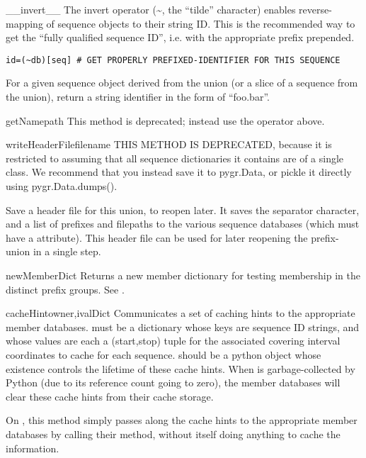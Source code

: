 \documentclass{howto}
\begin{document}
\begin{funcdesc}{__invert__}{}
  The invert operator (\textasciitilde, the ``tilde'' character) 
  enables reverse-mapping of sequence objects to their string ID.
  This is the recommended way to get the ``fully qualified sequence ID'', i.e. with
  the appropriate prefix prepended. 
\begin{verbatim}
id=(~db)[seq] # GET PROPERLY PREFIXED-IDENTIFIER FOR THIS SEQUENCE
\end{verbatim}
  For a given sequence object  derived from the union
  (or a slice of a sequence from the union), return a string identifier
  in the form of ``foo.bar''.  
\end{funcdesc}

\begin{funcdesc}{getName}{path}
  This method is deprecated; instead use the  operator
  above.
\end{funcdesc}

\begin{funcdesc}{writeHeaderFile}{filename}
  THIS METHOD IS DEPRECATED, because it is restricted to
  assuming that all sequence dictionaries it contains
  are of a single class.  We recommend that you instead save
  it to pygr.Data, or pickle it directly using pygr.Data.dumps().

  Save a header file for this union, to reopen later.
  It saves the separator character, and a list of prefixes
  and filepaths to the various sequence databases (which
  must have a  attribute).  This header
  file can be used for later reopening the prefix-union
  in a single step.
\end{funcdesc}

\begin{funcdesc}{newMemberDict}{}
  Returns a new member dictionary for testing membership in
  the distinct prefix groups.  See .
\end{funcdesc}

\begin{funcdesc}{cacheHint}{owner,ivalDict}
  Communicates a set of caching hints to the appropriate member
  databases.   must be a dictionary whose keys are
  sequence ID strings, and whose values are each a (start,stop) tuple
  for the associated covering interval coordinates to
  cache for each sequence.   should be a python object
  whose existence controls the lifetime of these cache hints.
  When  is garbage-collected by Python (due to its 
  reference count going to zero), the member databases will clear
  these cache hints from their cache storage.

  On , this method simply passes along
  the cache hints to the appropriate member databases by calling
  their  method, without itself doing anything
  to cache the information.
\end{funcdesc}
\end{document}
